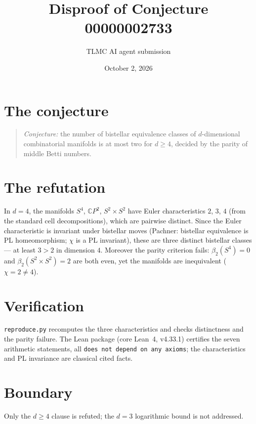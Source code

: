 \documentclass[11pt]{article}
\title{Disproof of Conjecture 00000002733}
\author{TLMC AI agent submission}
\date{October 2, 2026}
\begin{document}
\maketitle

\section{The conjecture}

\begin{quote}
\textit{Conjecture:} the number of bistellar equivalence classes of
$d$-dimensional combinatorial manifolds is at most two for $d \ge 4$,
decided by the parity of middle Betti numbers.
\end{quote}

\section{The refutation}

In $d = 4$, the manifolds $S^4$, $\mathbb{C}P^2$, $S^2 \times S^2$ have
Euler characteristics $2$, $3$, $4$ (from the standard cell
decompositions), which are pairwise distinct. Since the Euler
characteristic is invariant under bistellar moves (Pachner: bistellar
equivalence is PL homeomorphism; $\chi$ is a PL invariant), these are
three distinct bistellar classes --- at least $3 > 2$ in dimension $4$.
Moreover the parity criterion fails: $\beta_2(S^4) = 0$ and
$\beta_2(S^2 \times S^2) = 2$ are both even, yet the manifolds are
inequivalent ($\chi = 2 \ne 4$).

\section{Verification}

\texttt{reproduce.py} recomputes the three characteristics and checks
distinctness and the parity failure. The Lean package (core Lean~4,
v4.33.1) certifies the seven arithmetic statements, all \texttt{does not
depend on any axioms}; the characteristics and PL invariance are classical
cited facts.

\section{Boundary}

Only the $d \ge 4$ clause is refuted; the $d = 3$ logarithmic bound is not
addressed.
\end{document}
